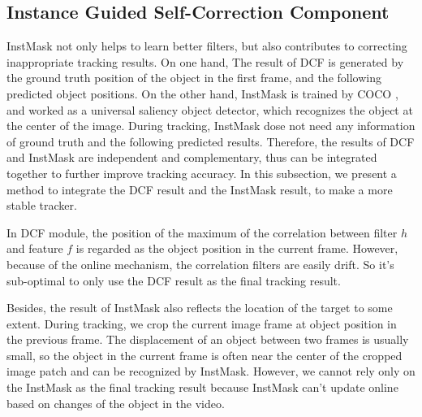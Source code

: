 \documentclass[review]{elsarticle}
\begin{document}
\begin{CJK*}{UTF8}{gbsn}
\subsection{Instance Guided Self-Correction Component} \label{sec:cog}
InstMask not only helps to learn better filters, but also contributes to correcting inappropriate tracking results. On one hand, The result of DCF is generated by the ground truth position of the object in the first frame, and the following predicted object positions. On the other hand,  InstMask is trained by COCO \cite{Lin2014MicrosoftCC}, and worked as a universal saliency object detector, which recognizes the object at the center of the image. During tracking, InstMask dose not need any information of ground truth and the following predicted results. Therefore, the results of DCF and InstMask are independent and complementary, thus can be integrated together to further improve tracking accuracy. In this subsection, we present a method to integrate the DCF result and the InstMask result, to make a more stable tracker.

In DCF module, the position of the maximum of the correlation between filter $h$ and feature $f$ is regarded as the object position in the current frame. However, because of the online mechanism, the correlation filters are easily drift. So it's sub-optimal to only use the DCF result as the final tracking result.

Besides, the result of InstMask also reflects the location of the target to some extent. During tracking, we crop the current image frame at object position in the previous frame. The displacement of an object between two frames is usually small, so the object in the current frame is often near the center of the cropped image patch and can be recognized by InstMask. However, we cannot rely only on the InstMask as the final tracking result because InstMask can't update online based on changes of the object in the video.


\end{CJK*}
\end{document}
